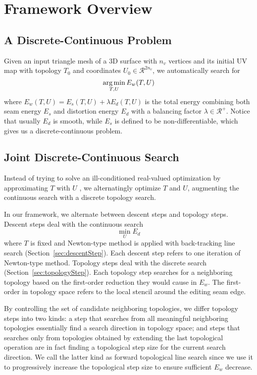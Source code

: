 
\section{Framework Overview}

\subsection{A Discrete-Continuous Problem}

Given an input triangle mesh of a 3D surface with $n_v$ vertices and its initial UV map with topology $T_0$ and coordinates $U_0 \in \mathcal{R}^{2n_v}$, we automatically search for
\[ \operatorname*{arg\,min}_{T,U} E_w(T,U) \]
where $E_w(T,U) = E_s(T,U) + \lambda E_d(T,U)$ is the total energy combining both seam energy $E_s$ and distortion energy $E_d$ with a balancing factor $\lambda \in \mathcal{R^+}$. Notice that usually $E_d$ is smooth, while $E_s$ is defined to be non-differentiable, which gives us a discrete-continuous problem.

\subsection{Joint Discrete-Continuous Search}

Instead of trying to solve an ill-conditioned real-valued optimization by approximating $T$ with $U$ \cite{Poranne2017Autocuts}, we alternatingly optimize $T$ and $U$, augmenting the continuous search with a discrete topology search.

In our framework, we alternate between descent steps and topology steps.
Descent steps deal with the continuous search
\[ \min_U E_d \]
where $T$ is fixed and Newton-type method is applied with back-tracking line search (Section~\ref{sec:descentStep}). Each descent step refers to one iteration of Newton-type method.
Topology steps deal with the discrete search (Section~\ref{sec:topologyStep}). Each topology step searches for a neighboring topology based on the first-order reduction they would cause in $E_w$. The first-order in topology space refers to the local stencil around the editing seam edge.

By controlling the set of candidate neighboring topologies, we differ topology steps into two kinds: a step that searches from all meaningful neighboring topologies essentially find a search direction in topology space; and steps that searches only from topologies obtained by extending the last topological operation are in fact finding a topological step size for the current search direction. We call the latter kind as forward topological line search since we use it to progressively increase the topological step size to ensure sufficient $E_w$ decrease.

